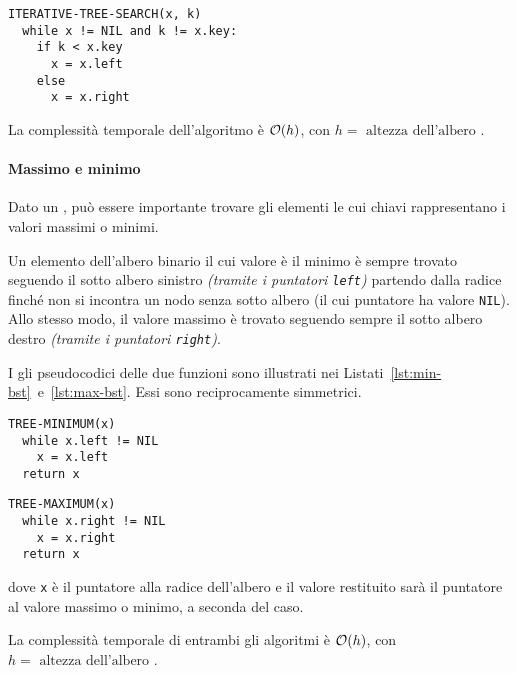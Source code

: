 \documentclass[italian, 10pt]{article}
\begin{document}
\begin{lstlisting}[float, style=pseudocode, caption={Ricerca iterativa di un nodo in un BST}, label={lst:iterative-tree-search}]
ITERATIVE-TREE-SEARCH(x, k)
  while x != NIL and k != x.key:
    if k < x.key
      x = x.left
    else
      x = x.right
\end{lstlisting}

\bigskip
La complessità temporale dell'algoritmo è \(\mathcal{O}(h)\), con \(h = \text{ altezza dell'albero }\).

\paragraph{Massimo e minimo}
\label{par:massimo-minimo-bst}

Dato un \BST, può essere importante trovare gli elementi le cui chiavi rappresentano i valori massimi o minimi.

Un elemento dell'albero binario il cui valore è il minimo è sempre trovato seguendo il sotto albero sinistro \textit{(tramite i puntatori \texttt{left})} partendo dalla radice finché non si incontra un nodo senza sotto albero (il cui puntatore ha valore \texttt{NIL}).
Allo stesso modo, il valore massimo è trovato seguendo sempre il sotto albero destro \textit{(tramite i puntatori \texttt{right})}.

I gli pseudocodici delle due funzioni sono illustrati nei Listati~\ref{lst:min-bst}~e~\ref{lst:max-bst}.
Essi sono reciprocamente simmetrici.

\begin{minipage}[t]{0.495\textwidth}
  \begin{lstlisting}[style=pseudocode, caption={Minimo di un BST}, label={lst:min-bst}]
TREE-MINIMUM(x)
  while x.left != NIL
    x = x.left
  return x
  \end{lstlisting}
\end{minipage}
\begin{minipage}[t]{0.495\textwidth}
  \begin{lstlisting}[style=pseudocode, caption={Massimo di un BST}, label={lst:max-bst}]
TREE-MAXIMUM(x)
  while x.right != NIL
    x = x.right
  return x
  \end{lstlisting}
\end{minipage}

dove \texttt{x} è il puntatore alla radice dell'albero e il valore restituito sarà il puntatore al valore massimo o minimo, a seconda del caso.

\bigskip
La complessità temporale di entrambi gli algoritmi è \(\mathcal{O}(h)\), con \(h = \text{ altezza dell'albero }\).
\end{document}
